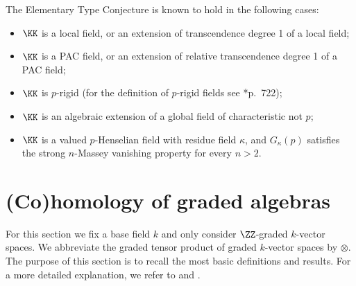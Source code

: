 \documentclass{amsart}
\theoremstyle{definition}
\theoremstyle{remark}
\numberwithin{equation}{section}
\begin{document}
The Elementary Type Conjecture is known to hold in the following cases:

\begin{itemize}
\item[(a)] $\KK$ is a local field, or an extension of transcendence degree 1 of a local field;
\item[(b)] $\KK$ is a PAC field, or an extension of relative transcendence degree 1 of a PAC field;
\item[(c)] $\KK$ is $p$-rigid {\rm (}for the definition of $p$-rigid fields see \cite{Ware1992}*{p.~722}{\rm )};
\item[(d)] $\KK$ is an algebraic extension of a global field of characteristic not $p$;
\item[(e)] $\KK$ is a valued $p$-Henselian field with residue field $\kappa$, and $G_{\kappa}(p)$ satisfies the strong $n$-Massey vanishing property for every $n>2$.
\end{itemize}

\section{(Co)homology of graded algebras}
\label{sec:CohomologyOfGradedAlgebras}
For this section we fix a base field $k$ and only consider $\ZZ$-graded $k$-vector spaces. We abbreviate the graded tensor product of graded $k$-vector spaces by $\otimes$. The purpose of this section is to recall the most basic definitions and results. For a more detailed explanation, we refer to \cite[Chapter 3]{LodayVallette2012} and \cites{PositselskiPolishchuk2005,PositselskiVishik1995,Positselski2005}.
\end{document}
